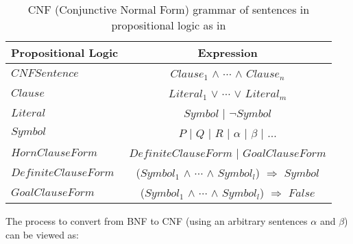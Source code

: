 \begin{table}[H]
  \centering
  \begin{tabular}{lc}
    \toprule

    \textbf{Propositional Logic}  \hspace{1cm}   & \textbf{Expression}  \\
    \toprule
    
    $CNFSentence$ & $Clause_1$ $\wedge$ $\cdots$  $\wedge$ $Clause_n$ \\ \midrule
    $Clause$ & $Literal_1$  $\vee$ $\cdots$  $\vee$  $Literal_m$   \\ \midrule  
    $Literal$ & $Symbol$ | $\neg Symbol$    \\ \midrule
    $Symbol$ & \textit{$P$} | \textit{$Q$} | \textit{$R$} | \textit{$\alpha$} | \textit{$\beta$} | ...  \\  \midrule
	 $HornClauseForm$ & $DefiniteClauseForm$ | $GoalClauseForm$    \\ 
	 $DefiniteClauseForm$ & ($Symbol_1$ $\wedge$ $\cdots$  $\wedge$ $Symbol_l$) $\Rightarrow$ $Symbol$   \\ 
	 $GoalClauseForm$ & ($Symbol_1$ $\wedge$ $\cdots$  $\wedge$ $Symbol_l$) $\Rightarrow$ $False$    \\   
   
    \bottomrule
  \end{tabular}
  \caption{CNF (Conjunctive Normal Form) grammar of sentences in propositional logic as in \citep{russell2016artificial}}
  \label{table:CNF_Syntax}
\end{table}
The process to convert from BNF to CNF (using an arbitrary sentences $\alpha$ and $\beta$) can be viewed as:
